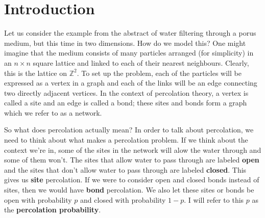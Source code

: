 \section{Introduction}
Let us consider the example from the abstract of water filtering through a porus medium, but this time in two dimensions. How do we model this? One might imagine that the medium consists of
many particles arranged (for simplicity) in an $n \times n$ square lattice and linked to each of their nearest neighbours. Clearly, this is the lattice on $\mathbb{Z}^2$.
To set up the problem, each of the particles will be expressed as a vertex in a graph and each of the links will be an edge connecting two directly adjacent vertices. In the
context of percolation theory, a vertex is called a site and an edge is
called a bond; these sites and bonds form a graph which we refer to as a network.




So what does percolation actually mean? In order to talk about percolation, we need to think about what makes a percolation problem. If we think about the context we're in, some of
the sites in the network will alow the water through and some of them won't. The sites that allow water to pass through are labeled \textbf{open} and the sites that don't allow
water to pass through are labeled \textbf{closed}. This gives us \textbf{site} percolation. If we were to consider open and closed bonds instead of sites, then we would have
\textbf{bond} percolation. We also let these sites or bonds be open with probability $p$ and closed with probability $1-p$. I will refer to this $p$ as the \textbf{percolation
probability}.


